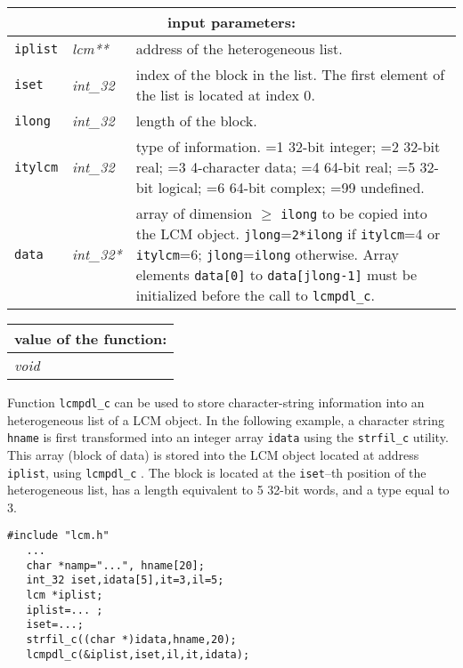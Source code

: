 \noindent
\begin{tabular}{|p{1.5cm}|p{2cm}|p{11cm}|}
\hline
\multicolumn{3}{|c|}{\bf input parameters:} \\
\hline
{\tt iplist} & {\it lcm**} & address of the heterogeneous list. \\
\hline
{\tt iset} & {\it int\_32} & index of the block in the list.
The first element of the list is located at index $0$. \\
\hline
{\tt ilong} & {\it int\_32} & length of the block. \\
\hline
{\tt itylcm} & {\it int\_32} & type of information. =1 32-bit integer; 
                                    =2 32-bit real; =3 4-character data; 
				    =4 64-bit real; =5 32-bit logical; =6 64-bit complex; =99 undefined. \\
\hline
{\tt data} & {\it int\_32*} & array of dimension $\ge$ {\tt ilong} to be copied into the LCM object. {\tt jlong}={\tt 2*ilong}
                                   if {\tt itylcm}=4 or {\tt itylcm}=6; {\tt jlong}={\tt ilong} otherwise.
                                   Array elements {\tt data[0]} to {\tt data[jlong-1]}
                                   must be initialized before the call to {\tt lcmpdl\_c}. \\
\hline
\end{tabular}

\vskip 0.8cm

\noindent
\begin{tabular}{|p{4.0cm}|p{11cm}|}
\hline
\multicolumn{2}{|c|}{\bf value of the function:} \\
\hline
{\it void} &  \\
\hline
\end{tabular}

\vskip 0.4cm

Function {\tt lcmpdl\_c}  can be used to store character-string information into an heterogeneous list of a LCM object. In the
following example, a character string {\tt hname} is first transformed into an integer array {\tt idata}
using the {\tt strfil\_c} utility. This array (block of data) is stored into the LCM object located at
address {\tt iplist}, using {\tt lcmpdl\_c} . The block is located at the {\tt iset}--th position of the heterogeneous list, has a length equivalent to 5 32-bit words, and a type
equal to 3.

\begin{verbatim}
#include "lcm.h"
   ...
   char *namp="...", hname[20];
   int_32 iset,idata[5],it=3,il=5;
   lcm *iplist;
   iplist=... ;
   iset=...;
   strfil_c((char *)idata,hname,20);
   lcmpdl_c(&iplist,iset,il,it,idata);
\end{verbatim}

